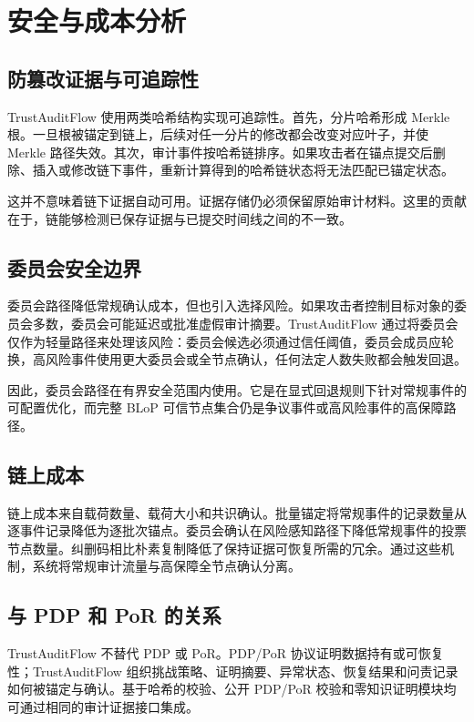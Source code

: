 \section{安全与成本分析}

\subsection{防篡改证据与可追踪性}

TrustAuditFlow 使用两类哈希结构实现可追踪性。首先，分片哈希形成 Merkle 根。一旦根被锚定到链上，后续对任一分片的修改都会改变对应叶子，并使 Merkle 路径失效。其次，审计事件按哈希链排序。如果攻击者在锚点提交后删除、插入或修改链下事件，重新计算得到的哈希链状态将无法匹配已锚定状态。

这并不意味着链下证据自动可用。证据存储仍必须保留原始审计材料。这里的贡献在于，链能够检测已保存证据与已提交时间线之间的不一致。

\subsection{委员会安全边界}

委员会路径降低常规确认成本，但也引入选择风险。如果攻击者控制目标对象的委员会多数，委员会可能延迟或批准虚假审计摘要。TrustAuditFlow 通过将委员会仅作为轻量路径来处理该风险：委员会候选必须通过信任阈值，委员会成员应轮换，高风险事件使用更大委员会或全节点确认，任何法定人数失败都会触发回退。

因此，委员会路径在有界安全范围内使用。它是在显式回退规则下针对常规事件的可配置优化，而完整 BLoP 可信节点集合仍是争议事件或高风险事件的高保障路径。

\subsection{链上成本}

链上成本来自载荷数量、载荷大小和共识确认。批量锚定将常规事件的记录数量从逐事件记录降低为逐批次锚点。委员会确认在风险感知路径下降低常规事件的投票节点数量。纠删码相比朴素复制降低了保持证据可恢复所需的冗余。通过这些机制，系统将常规审计流量与高保障全节点确认分离。

\subsection{与 PDP 和 PoR 的关系}

TrustAuditFlow 不替代 PDP 或 PoR。PDP/PoR 协议证明数据持有或可恢复性；TrustAuditFlow 组织挑战策略、证明摘要、异常状态、恢复结果和问责记录如何被锚定与确认。基于哈希的校验、公开 PDP/PoR 校验和零知识证明模块均可通过相同的审计证据接口集成。


